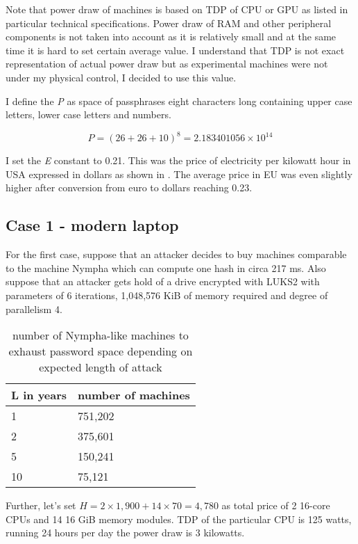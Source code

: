 \documentclass[nolof]{fithesis3}
\begin{document}
Note that power draw of machines is based on TDP of CPU or GPU as listed in particular technical specifications. Power draw of RAM and other peripheral components is not taken into account as it is relatively small and at the same time it is hard to set certain average value. I understand that TDP is not exact representation of actual power draw but as experimental machines were not under my physical control, I decided to use this value.

I define the \emph{P} as space of passphrases eight characters long containing upper case letters, lower case letters and numbers.

$$P = (26 + 26 + 10)^8 = 2.183401056 \times 10^{14}$$

I set the \emph{E} constant to 0.21. This was the price of electricity per kilowatt hour in USA expressed in dollars as shown in \parencite{electricity}. The average price in EU was even slightly higher after conversion from euro to dollars reaching 0.23.

\subsection{Case 1 - modern laptop}
\FloatBarrier
For the first case, suppose that an attacker decides to buy machines comparable to the machine Nympha which can compute one hash in circa 217 ms. Also suppose that an attacker gets hold of a drive encrypted with LUKS2 with parameters of 6 iterations, 1,048,576 KiB of memory required and degree of parallelism 4.

\noindent
\begin{table}
\caption{number of Nympha-like machines to exhaust password space depending on expected length of attack}
\label{tab:at1}
\begin{tabularx}{\textwidth}{| X | X |}
\hline
L in years & number of machines\\
\hline
1 & 751,202\\
\hline
2 & 375,601\\
\hline
5 & 150,241\\
\hline
10 & 75,121\\
\hline
\end{tabularx}
\end{table}

Further, let's set $H = 2 \times 1,900 + 14 \times 70 = 4,780$ as total price of 2 16-core CPUs and 14 16 GiB memory modules. TDP of the particular CPU is 125 watts, running 24 hours per day the power draw is 3 kilowatts.
\end{document}
